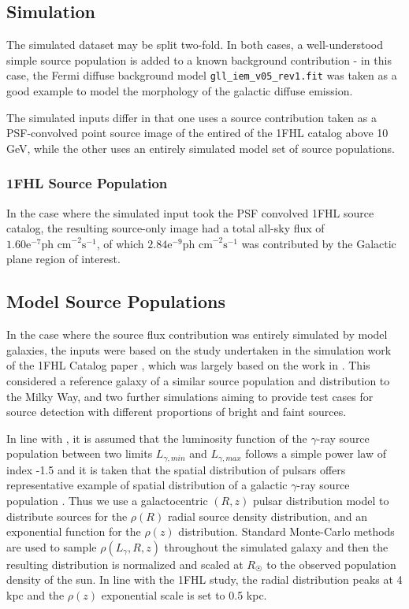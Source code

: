 \documentclass{PoS}
\begin{document}
\subsection{Simulation}

The simulated dataset may be split two-fold. In both cases, a well-understood simple source population is added to a known background contribution - in this case, the Fermi diffuse background model \verb|gll_iem_v05_rev1.fit| was taken as a good example to model the morphology of the galactic diffuse emission.

The simulated inputs differ in that one uses a source contribution taken as a PSF-convolved point source image of the entired of the 1FHL catalog above 10 GeV, while the other uses an entirely simulated model set of source populations.

\subsubsection{1FHL Source Population}

In the case where the simulated input took the PSF convolved 1FHL source catalog, the resulting source-only image had a total all-sky flux of $1.60\text{e}^{-7} \text{ph cm}^{-2}\text{s}^{-1}$, of which $2.84\text{e}^{-9} \text{ph cm}^{-2}\text{s}^{-1}$ was contributed by the Galactic plane region of interest.

\subsection{Model Source Populations}

In the case where the source flux contribution was entirely simulated by model galaxies, the inputs were based on the study undertaken in the simulation work of the 1FHL Catalog paper \cite[p.59]{1fhl}, which was largely based on the work in \cite{Strong}. This considered a reference galaxy of a similar source population and distribution to the Milky Way, and two further simulations aiming to provide test cases for source detection with different proportions of bright and faint sources.

In line with \cite{Strong}, it is assumed that the luminosity function of the $\gamma$-ray source population between two limits $L_{\gamma, min}$ and $L_{\gamma, max}$ follows a simple power law of index -1.5 and it is taken that the spatial distribution of pulsars offers representative example of spatial distribution of a galactic $\gamma$-ray source population \cite[p.2]{Strong}. Thus we use a galactocentric $(R, z)$ pulsar distribution model \cite[p.7]{Lorimer} to distribute sources for the $\rho(R)$ radial source density distribution, and an exponential function for the $\rho(z)$ distribution. Standard Monte-Carlo methods are used to sample $\rho(L_{\gamma}, R, z)$ throughout the simulated galaxy and then the resulting distribution is normalized and scaled at $R_{\astrosun}$ to the observed population density of the sun. In line with the 1FHL study, the radial distribution peaks at 4 kpc and the $\rho(z)$ exponential scale is set to 0.5 kpc.
\end{document}
